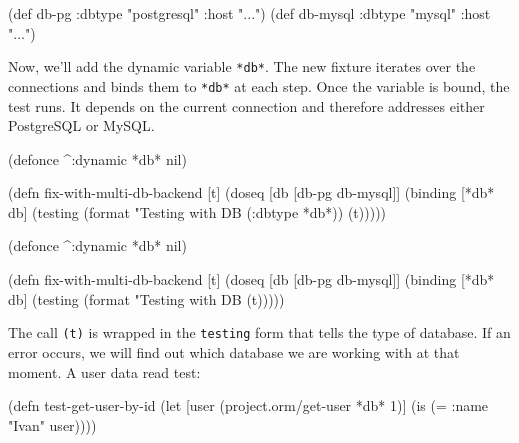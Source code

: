 \begin{english}
  \begin{clojure}
(def db-pg    {:dbtype "postgresql" :host "..."})
(def db-mysql {:dbtype "mysql"      :host "..."})
  \end{clojure}
\end{english}

\fi

Now, we'll add the dynamic variable \verb|*db*|. The new fixture iterates over the connections and binds them to \verb|*db*| at each step. Once the variable is bound, the test runs. It depends on the current connection and therefore addresses either PostgreSQL or MySQL.

\ifx\DEVICETYPE\MOBILE

\begin{english}
  \begin{clojure}
(defonce ^:dynamic *db* nil)

(defn fix-with-multi-db-backend [t]
  (doseq [db [db-pg db-mysql]]
    (binding [*db* db]
      (testing
        (format "Testing with DB %
          (:dbtype *db*))
        (t)))))
  \end{clojure}
\end{english}

\else

\begin{english}
  \begin{clojure}
(defonce ^:dynamic *db* nil)

(defn fix-with-multi-db-backend [t]
  (doseq [db [db-pg db-mysql]]
    (binding [*db* db]
      (testing (format "Testing with DB %
        (t)))))
  \end{clojure}
\end{english}

\fi

The call \verb|(t)| is wrapped in the \verb|testing| form that tells the type of database. If an error occurs, we will find out which database we are working with at that moment. A user data read test:

\ifx\DEVICETYPE\MOBILE

\begin{english}
  \begin{clojure}
(defn test-get-user-by-id
  (let [user
        (project.orm/get-user *db* 1)]
    (is (= {:name "Ivan"} user))))
  \end{clojure}
\end{english}

\else

